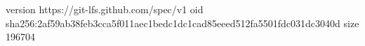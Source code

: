 version https://git-lfs.github.com/spec/v1
oid sha256:2af59ab38feb3cca5f011aec1bedc1dc1cad85eeed512fa5501fdc031dc3040d
size 196704
